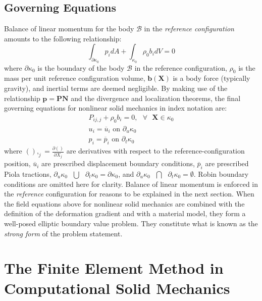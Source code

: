 \subsection{Governing Equations}
Balance of linear momentum for the body $\mathcal{B}$ in the \textit{reference configuration} amounts to the following relationship:
\begin{equation}
\int_{\partial \kappa_0}{p_i}dA + \int_{\kappa_0}\rho_0{b}_idV = 0
\end{equation}
where $\partial \kappa_0$ is the boundary of the body $\mathcal{B}$ in the reference configuration, $\rho_0$ is the mass per unit reference configuration volume, $\bm{b}(\bm{X})$ is a body force (typically gravity), and inertial terms are deemed negligible. By making use of the relationship $\bm{p} = \bm{P}\bm{N}$ and the divergence and localization theorems, the final governing equations for nonlinear solid mechanics in index notation are:
\begin{gather}
P_{ij,j} + \rho_0b_i = 0, \text{\ \ } \forall \text{\ \ } \bm{X} \in \kappa_0 \label{eqn:equilibrium} \\
{u_i} = \overline{{u}}_i \text{\ \ on\ \ } \partial_u\kappa_0 \\
{p_i} = \overline{{p}}_i\text{\ \ on\ \ } \partial_t\kappa_0
\end{gather}
where $(),_j = \frac{\partial()}{\partial {{X_j}}}$ are derivatives with respect to the reference-configuration position, $\overline{{u}}_i$ are prescribed displacement boundary conditions, ${\overline{p}_i}$ are prescribed Piola tractions, $\partial_u\kappa_0 \text{\ }\bigcup\text{\ } \partial_t\kappa_0 = \partial\kappa_0$, and $\partial_u\kappa_0 \text{\ }\bigcap\text{\ } \partial_t\kappa_0 = \emptyset$. Robin boundary conditions are omitted here for clarity. Balance of linear momentum is enforced in the \textit{reference} configuration for reasons to be explained in the next section. When the field equations above for nonlinear solid mechanics are combined with the definition of the deformation gradient and with a material model, they form a well-posed elliptic boundary value problem. They constitute what is known as the \textit{strong form} of the problem statement.

\section{The Finite Element Method in Computational Solid Mechanics}
\label{The Finite Element Method in Computational Solid Mechanics}

